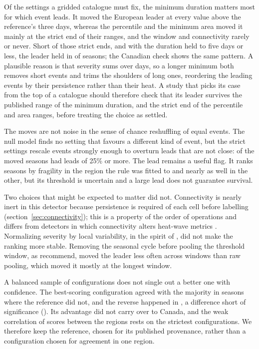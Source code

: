 \documentclass{amsdraft}
\begin{document}
Of the settings a gridded catalogue must fix, the minimum duration matters
most for which event leads. It moved the European leader at every value
above the reference's three days, whereas the percentile and the minimum
area moved it mainly at the strict end of their ranges, and the window and
connectivity rarely or never. Short of those strict ends, and with the
duration held to five days or less, the leader held in \NHeldAllMild{} of
\NSummers{} seasons; the Canadian check shows the same pattern. A plausible
reason is that severity sums over days, so a longer minimum both removes
short events and trims the shoulders of long ones, reordering the leading
events by their persistence rather than their heat. A study that picks its
case from the top of a catalogue should therefore check that its leader
survives the published range of the minimum duration, and the strict end of
the percentile and area ranges, before treating the choice as settled.

The moves are not noise in the sense of chance reshuffling of equal events.
The null model finds no setting that favours a different kind of event, but
the strict settings rescale events strongly enough to overturn leads that are
not close: \NMovedBigLead{} of the moved seasons had leads of 25\% or more.
The lead remains a useful flag. It ranks seasons by fragility in the region
the rule was fitted to and nearly as well in the other, but its threshold is
uncertain and a large lead does not guarantee survival.

Two choices that might be expected to matter did not. Connectivity is
nearly inert in this detector because persistence is required of each cell
before labelling (section~\ref{sec:connectivity}); this is a property of the
order of operations and differs from detectors in which connectivity alters
heat-wave metrics \citep{Zhang2025}. Normalizing severity by local
variability, in the spirit of \citet{Russo2015}, did not make the ranking
more stable. Removing the seasonal cycle before pooling the
threshold window, as \citet{BrunnerVoigt2024} recommend, moved the leader
less often across windows than raw pooling, which moved it mostly at the
longest window.

A balanced sample of configurations does not single out a better one with
confidence. The best-scoring configuration agreed with the majority in
\NTopOnly{} seasons where the reference did not, and the reverse happened in
\NRefOnly{}, a difference short of significance (\PTopVsRef{}). Its
advantage did not carry over to Canada, and the weak correlation of scores
between the regions rests on the strictest configurations. We therefore keep
the reference, chosen for its published provenance, rather than a
configuration chosen for agreement in one region.
\end{document}
